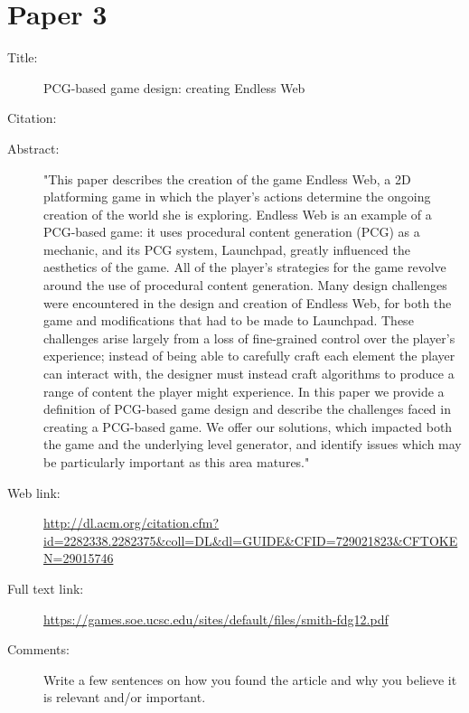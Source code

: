 \documentclass{scrartcl}
\begin{document}
\section*{Paper 3}
\begin{description}
\item[Title:] PCG-based game design: creating Endless Web
\item[Citation:] \cite{Smith:2012}
\item[Abstract:] "This paper describes the creation of the game Endless Web, a 2D platforming game in which the player's actions determine the ongoing creation of the world she is exploring. Endless Web is an example of a PCG-based game: it uses procedural content generation (PCG) as a mechanic, and its PCG system, Launchpad, greatly influenced the aesthetics of the game. All of the player's strategies for the game revolve around the use of procedural content generation. Many design challenges were encountered in the design and creation of Endless Web, for both the game and modifications that had to be made to Launchpad. These challenges arise largely from a loss of fine-grained control over the player's experience; instead of being able to carefully craft each element the player can interact with, the designer must instead craft algorithms to produce a range of content the player might experience. In this paper we provide a definition of PCG-based game design and describe the challenges faced in creating a PCG-based game. We offer our solutions, which impacted both the game and the underlying level generator, and identify issues which may be particularly important as this area matures."
\item[Web link:] \url{http://dl.acm.org/citation.cfm?id=2282338.2282375&coll=DL&dl=GUIDE&CFID=729021823&CFTOKEN=29015746}
\item[Full text link:] \url{https://games.soe.ucsc.edu/sites/default/files/smith-fdg12.pdf}
\item[Comments:] Write a few sentences on how you found the article and why you believe it is relevant and/or important.
\end{description}
\end{document}
